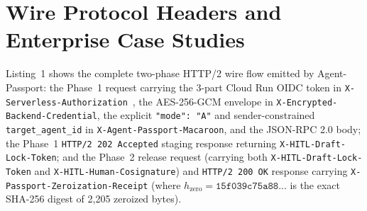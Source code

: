 \documentclass[conference,10pt]{IEEEtran}
\begin{document}
\section{Wire Protocol Headers and Enterprise Case Studies}

Listing~1 shows the complete two-phase HTTP/2 wire flow emitted by Agent-Passport: the Phase~1 request carrying the 3-part Cloud Run OIDC token in \texttt{X-Serverless-Authorization}~\cite{tsao2023cloudrun}, the AES-256-GCM envelope in \texttt{X-Encrypted-Backend-Credential}, the explicit \texttt{"mode": "A"} and sender-constrained \texttt{target\_agent\_id} in \texttt{X-Agent-Passport-Macaroon}, and the JSON-RPC 2.0 body; the Phase~1 \texttt{HTTP/2 202 Accepted} staging response returning \texttt{X-HITL-Draft-Lock-Token}; and the Phase~2 release request (carrying both \texttt{X-HITL-Draft-Lock-Token} and \texttt{X-HITL-Human-Cosignature}) and \texttt{HTTP/2 200 OK} response carrying \texttt{X-Passport-Zeroization-Receipt} (where $h_{\text{zero}} = \texttt{15f039c75a88...}$ is the exact SHA-256 digest of 2,205 zeroized bytes).
\end{document}
